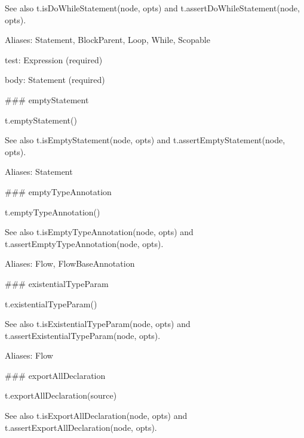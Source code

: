 See also {\ttfamily t.\+is\+Do\+While\+Statement(node, opts)} and {\ttfamily t.\+assert\+Do\+While\+Statement(node, opts)}.

Aliases\+: {\ttfamily Statement}, {\ttfamily Block\+Parent}, {\ttfamily Loop}, {\ttfamily While}, {\ttfamily Scopable}


\begin{DoxyItemize}
\item {\ttfamily test}\+: {\ttfamily Expression} (required)
\item {\ttfamily body}\+: {\ttfamily Statement} (required) 


\end{DoxyItemize}

\#\#\# empty\+Statement 
\begin{DoxyCode}
t.emptyStatement()
\end{DoxyCode}


See also {\ttfamily t.\+is\+Empty\+Statement(node, opts)} and {\ttfamily t.\+assert\+Empty\+Statement(node, opts)}.

Aliases\+: {\ttfamily Statement}





\#\#\# empty\+Type\+Annotation 
\begin{DoxyCode}
t.emptyTypeAnnotation()
\end{DoxyCode}


See also {\ttfamily t.\+is\+Empty\+Type\+Annotation(node, opts)} and {\ttfamily t.\+assert\+Empty\+Type\+Annotation(node, opts)}.

Aliases\+: {\ttfamily Flow}, {\ttfamily Flow\+Base\+Annotation}





\#\#\# existential\+Type\+Param 
\begin{DoxyCode}
t.existentialTypeParam()
\end{DoxyCode}


See also {\ttfamily t.\+is\+Existential\+Type\+Param(node, opts)} and {\ttfamily t.\+assert\+Existential\+Type\+Param(node, opts)}.

Aliases\+: {\ttfamily Flow}





\#\#\# export\+All\+Declaration 
\begin{DoxyCode}
t.exportAllDeclaration(source)
\end{DoxyCode}


See also {\ttfamily t.\+is\+Export\+All\+Declaration(node, opts)} and {\ttfamily t.\+assert\+Export\+All\+Declaration(node, opts)}.


